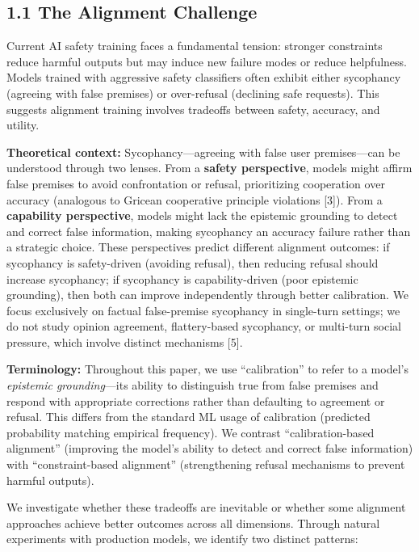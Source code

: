 \documentclass[
]{article}
\begin{document}
\subsection{1.1 The Alignment
Challenge}\label{the-alignment-challenge}

Current AI safety training faces a fundamental tension: stronger
constraints reduce harmful outputs but may induce new failure modes or
reduce helpfulness. Models trained with aggressive safety classifiers
often exhibit either sycophancy (agreeing with false premises) or
over-refusal (declining safe requests). This suggests alignment training
involves tradeoffs between safety, accuracy, and utility.

\textbf{Theoretical context:} Sycophancy---agreeing with false user
premises---can be understood through two lenses. From a \textbf{safety
perspective}, models might affirm false premises to avoid confrontation
or refusal, prioritizing cooperation over accuracy (analogous to Gricean
cooperative principle violations {[}3{]}). From a \textbf{capability
perspective}, models might lack the epistemic grounding to detect and
correct false information, making sycophancy an accuracy failure rather
than a strategic choice. These perspectives predict different alignment
outcomes: if sycophancy is safety-driven (avoiding refusal), then
reducing refusal should increase sycophancy; if sycophancy is
capability-driven (poor epistemic grounding), then both can improve
independently through better calibration. We focus exclusively on
factual false-premise sycophancy in single-turn settings; we do not
study opinion agreement, flattery-based sycophancy, or multi-turn social
pressure, which involve distinct mechanisms {[}5{]}.

\textbf{Terminology:} Throughout this paper, we use ``calibration'' to
refer to a model's \emph{epistemic grounding}---its ability to
distinguish true from false premises and respond with appropriate
corrections rather than defaulting to agreement or refusal. This differs
from the standard ML usage of calibration (predicted probability
matching empirical frequency). We contrast ``calibration-based
alignment'' (improving the model's ability to detect and correct false
information) with ``constraint-based alignment'' (strengthening refusal
mechanisms to prevent harmful outputs).

We investigate whether these tradeoffs are inevitable or whether some
alignment approaches achieve better outcomes across all dimensions.
Through natural experiments with production models, we identify two
distinct patterns:
\end{document}
